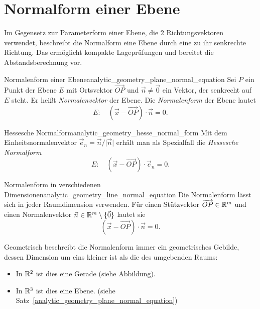 \section{Normalform einer Ebene}
\label{sec:analytic_geometry_normal_forms}

Im Gegensetz zur Parameterform einer Ebene, die 2 Richtungsvektoren verwendet, 
beschreibt die Normalform eine Ebene durch eine zu ihr senkrechte Richtung. 
Das ermöglicht kompakte Lageprüfungen und bereitet die Abstandsberechnung vor.

\begin{TheoremBox}{Normalenform einer Ebene}{analytic_geometry_plane_normal_equation}
  Sei $P$ ein Punkt der Ebene $E$ mit Ortsvektor $\overrightarrow{OP}$ und
  $\vec n\ne\vec 0$ ein Vektor, der senkrecht auf $E$ steht. Er heißt
  \emph{Normalenvektor}  der Ebene.
  Die \emph{Normalenform}
   der Ebene lautet
  \[
    E:\quad (\vec x-\overrightarrow{OP})\cdot\vec n=0.
  \]
  \begin{center}
  \end{center}
\end{TheoremBox}

\begin{KeyPointBox}{Hessesche Normalform}{analytic_geometry_hesse_normal_form}
  Mit dem Einheitsnormalenvektor
  $\vec e_n=\vec n/\lvert\vec n\rvert$ erhält man als Spezialfall die
  \emph{Hessesche Normalform} 
  \[
    E:\quad (\vec x-\overrightarrow{OP})\cdot\vec e_n=0.
  \]
\end{KeyPointBox}

\begin{KeyPointBox}{Normalenform in verschiedenen Dimensionen}{analytic_geometry_line_normal_equation}
  Die Normalenform lässt sich in jeder Raumdimension verwenden. Für einen
  Stützvektor $\overrightarrow{OP}\in\mathbb{R}^m$ und einen Normalenvektor
  $\vec n\in\mathbb{R}^m\setminus\{\vec 0\}$ lautet sie
  \[
    (\vec x-\overrightarrow{OP})\cdot\vec n=0.
  \]
  \begin{minipage}[c]{0.52\linewidth}
  Geometrisch beschreibt die Normalenform immer ein geometrisches Gebilde, dessen Dimension
  um eins kleiner ist als die des umgebenden Raums:

  \begin{itemize}
    \item In $\mathbb{R}^2$ ist dies eine Gerade (siehe Abbildung).
    \item In $\mathbb{R}^3$ ist dies eine Ebene. (siehe Satz~\ref{analytic_geometry_plane_normal_equation})
  \end{itemize}
  \end{minipage}\hfill
  \begin{minipage}[c]{0.45\linewidth}
    \centering
  \end{minipage}


\end{KeyPointBox}


